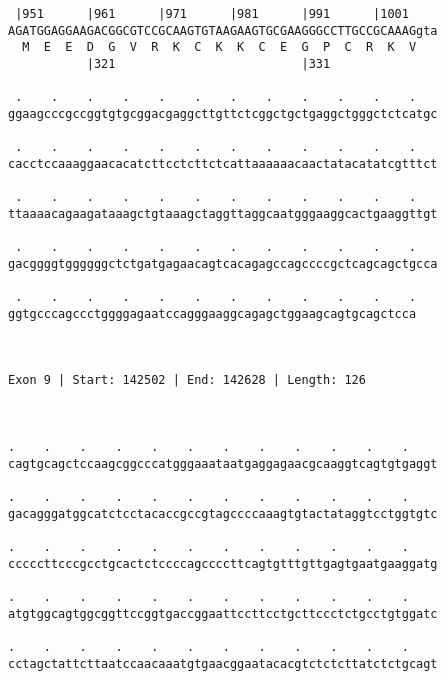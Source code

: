 \documentclass{article}
\begin{document}
\begin{Verbatim}
 |951      |961      |971      |981      |991      |1001    
AGATGGAGGAAGACGGCGTCCGCAAGTGTAAGAAGTGCGAAGGGCCTTGCCGCAAAGgta
  M  E  E  D  G  V  R  K  C  K  K  C  E  G  P  C  R  K  V   
           |321                          |331               
  
 .    .    .    .    .    .    .    .    .    .    .    .   
ggaagcccgccggtgtgcggacgaggcttgttctcggctgctgaggctgggctctcatgc
                                                            
 .    .    .    .    .    .    .    .    .    .    .    .   
cacctccaaaggaacacatcttcctcttctcattaaaaaacaactatacatatcgtttct
                                                            
 .    .    .    .    .    .    .    .    .    .    .    .   
ttaaaacagaagataaagctgtaaagctaggttaggcaatgggaaggcactgaaggttgt
                                                            
 .    .    .    .    .    .    .    .    .    .    .    .   
gacggggtggggggctctgatgagaacagtcacagagccagccccgctcagcagctgcca
                                                            
 .    .    .    .    .    .    .    .    .    .    .    .
ggtgcccagccctggggagaatccagggaaggcagagctggaagcagtgcagctcca
                                                         
                                                         
 
Exon 9 | Start: 142502 | End: 142628 | Length: 126



.    .    .    .    .    .    .    .    .    .    .    .    
cagtgcagctccaagcggcccatgggaaataatgaggagaacgcaaggtcagtgtgaggt
                                                            
.    .    .    .    .    .    .    .    .    .    .    .    
gacagggatggcatctcctacaccgccgtagccccaaagtgtactataggtcctggtgtc
                                                            
.    .    .    .    .    .    .    .    .    .    .    .    
cccccttcccgcctgcactctccccagccccttcagtgtttgttgagtgaatgaaggatg
                                                            
.    .    .    .    .    .    .    .    .    .    .    .    
atgtggcagtggcggttccggtgaccggaattccttcctgcttccctctgcctgtggatc
                                                            
.    .    .    .    .    .    .    .    .    .    .    .    
cctagctattcttaatccaacaaatgtgaacggaatacacgtctctcttatctctgcagt
                                                            

\end{Verbatim}
\end{document}
